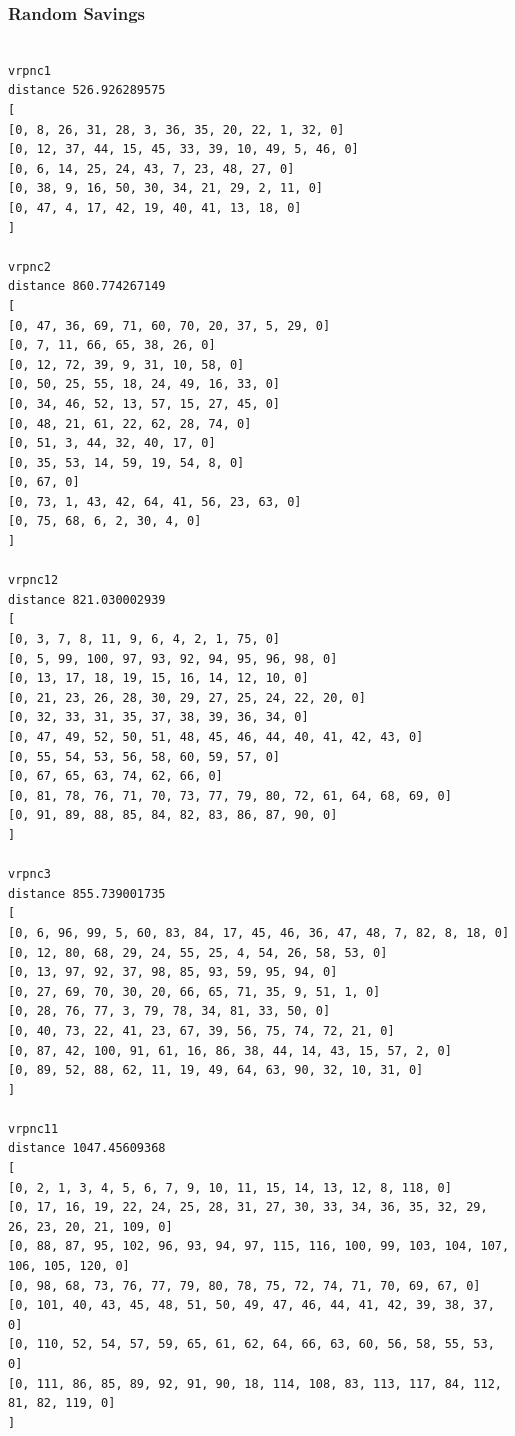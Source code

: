 \documentclass{article} %
\begin{document}
\subsubsection{Random Savings}
\begin{lstlisting}[breaklines, basicstyle=\tiny]

vrpnc1
distance 526.926289575
[
[0, 8, 26, 31, 28, 3, 36, 35, 20, 22, 1, 32, 0]
[0, 12, 37, 44, 15, 45, 33, 39, 10, 49, 5, 46, 0]
[0, 6, 14, 25, 24, 43, 7, 23, 48, 27, 0]
[0, 38, 9, 16, 50, 30, 34, 21, 29, 2, 11, 0]
[0, 47, 4, 17, 42, 19, 40, 41, 13, 18, 0]
]

vrpnc2
distance 860.774267149
[
[0, 47, 36, 69, 71, 60, 70, 20, 37, 5, 29, 0]
[0, 7, 11, 66, 65, 38, 26, 0]
[0, 12, 72, 39, 9, 31, 10, 58, 0]
[0, 50, 25, 55, 18, 24, 49, 16, 33, 0]
[0, 34, 46, 52, 13, 57, 15, 27, 45, 0]
[0, 48, 21, 61, 22, 62, 28, 74, 0]
[0, 51, 3, 44, 32, 40, 17, 0]
[0, 35, 53, 14, 59, 19, 54, 8, 0]
[0, 67, 0]
[0, 73, 1, 43, 42, 64, 41, 56, 23, 63, 0]
[0, 75, 68, 6, 2, 30, 4, 0]
]

vrpnc12
distance 821.030002939
[
[0, 3, 7, 8, 11, 9, 6, 4, 2, 1, 75, 0]
[0, 5, 99, 100, 97, 93, 92, 94, 95, 96, 98, 0]
[0, 13, 17, 18, 19, 15, 16, 14, 12, 10, 0]
[0, 21, 23, 26, 28, 30, 29, 27, 25, 24, 22, 20, 0]
[0, 32, 33, 31, 35, 37, 38, 39, 36, 34, 0]
[0, 47, 49, 52, 50, 51, 48, 45, 46, 44, 40, 41, 42, 43, 0]
[0, 55, 54, 53, 56, 58, 60, 59, 57, 0]
[0, 67, 65, 63, 74, 62, 66, 0]
[0, 81, 78, 76, 71, 70, 73, 77, 79, 80, 72, 61, 64, 68, 69, 0]
[0, 91, 89, 88, 85, 84, 82, 83, 86, 87, 90, 0]
]

vrpnc3
distance 855.739001735
[
[0, 6, 96, 99, 5, 60, 83, 84, 17, 45, 46, 36, 47, 48, 7, 82, 8, 18, 0]
[0, 12, 80, 68, 29, 24, 55, 25, 4, 54, 26, 58, 53, 0]
[0, 13, 97, 92, 37, 98, 85, 93, 59, 95, 94, 0]
[0, 27, 69, 70, 30, 20, 66, 65, 71, 35, 9, 51, 1, 0]
[0, 28, 76, 77, 3, 79, 78, 34, 81, 33, 50, 0]
[0, 40, 73, 22, 41, 23, 67, 39, 56, 75, 74, 72, 21, 0]
[0, 87, 42, 100, 91, 61, 16, 86, 38, 44, 14, 43, 15, 57, 2, 0]
[0, 89, 52, 88, 62, 11, 19, 49, 64, 63, 90, 32, 10, 31, 0]
]

vrpnc11
distance 1047.45609368
[
[0, 2, 1, 3, 4, 5, 6, 7, 9, 10, 11, 15, 14, 13, 12, 8, 118, 0]
[0, 17, 16, 19, 22, 24, 25, 28, 31, 27, 30, 33, 34, 36, 35, 32, 29, 26, 23, 20, 21, 109, 0]
[0, 88, 87, 95, 102, 96, 93, 94, 97, 115, 116, 100, 99, 103, 104, 107, 106, 105, 120, 0]
[0, 98, 68, 73, 76, 77, 79, 80, 78, 75, 72, 74, 71, 70, 69, 67, 0]
[0, 101, 40, 43, 45, 48, 51, 50, 49, 47, 46, 44, 41, 42, 39, 38, 37, 0]
[0, 110, 52, 54, 57, 59, 65, 61, 62, 64, 66, 63, 60, 56, 58, 55, 53, 0]
[0, 111, 86, 85, 89, 92, 91, 90, 18, 114, 108, 83, 113, 117, 84, 112, 81, 82, 119, 0]
]


\end{lstlisting}
\end{document}
